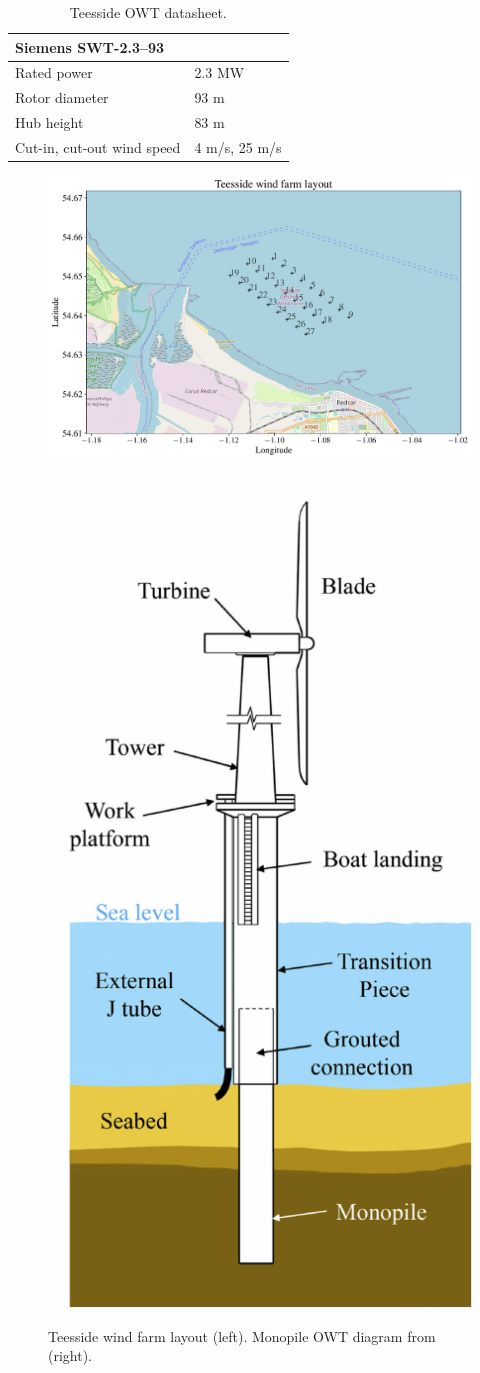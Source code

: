 
\begin{table}
    \centering
    \caption{Teesside OWT datasheet.}
    \begin{tabular}{ll}
     \hline
     \multicolumn{2}{l}{Siemens SWT-2.3–93} \\ \hline
        Rated power & 2.3 MW\\
        Rotor diameter & 93 m\\
        Hub height & 83 m\\
        Cut-in, cut-out wind speed & 4 m/s, 25 m/s\\\hline
    \end{tabular}
    \label{tab:owt_datasheet}
\end{table}

\begin{figure}
\begin{center}
    \includegraphics[width=0.6\linewidth]{part2/figures/DCE/teesside/map_teesside_layout.pdf}
    \includegraphics[width=0.25\linewidth]{part2/figures/DCE/teesside/owt_diagram.pdf}
\end{center}
\caption{Teesside wind farm layout (left). Monopile OWT diagram from \citep{chen_2018_owt_diagram} (right).}
\label{fig:teesside_layout}
\end{figure}

